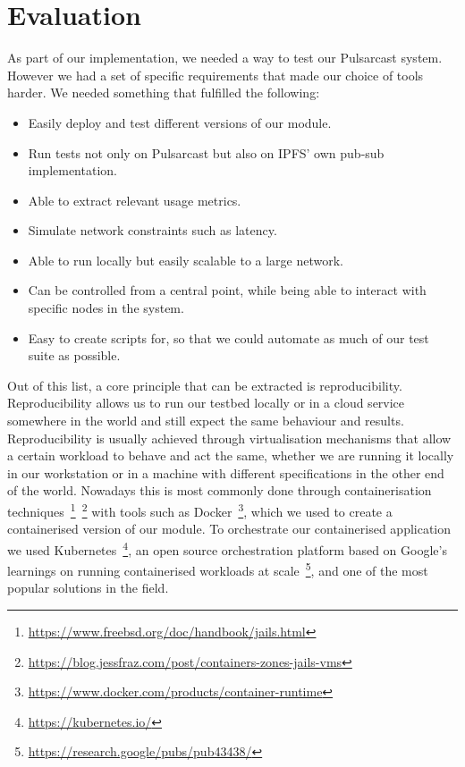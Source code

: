 
\section{Evaluation}
\label{section:evaluation}

As part of our implementation, we needed a way to test our Pulsarcast system.
However we had a set of specific requirements that made our choice of tools
harder. We needed something that fulfilled the following:

\begin{itemize}
  \item Easily deploy and test different versions of our module.
  \item Run tests not only on Pulsarcast but also on IPFS' own pub-sub
    implementation.
  \item Able to extract relevant usage metrics.
  \item Simulate network constraints such as latency.
  \item Able to run locally but easily scalable to a large network.
  \item Can be controlled from a central point, while being able to interact
    with specific nodes in the system.
  \item Easy to create scripts for, so that we could automate as much of our
    test suite as possible.
\end{itemize}

Out of this list, a core principle that can be extracted is
reproducibility. Reproducibility allows us to run our testbed locally or in a
cloud service somewhere in the world and still expect the same behaviour and
results. Reproducibility is usually achieved through virtualisation mechanisms
that allow a certain workload to behave and act the same, whether we are
running it locally in our workstation or in a machine with different
specifications in the other end of the world. Nowadays this is most commonly
done through containerisation
techniques~\footnote{\url{https://www.freebsd.org/doc/handbook/jails.html}}~\footnote{\url{https://blog.jessfraz.com/post/containers-zones-jails-vms}}
with tools such as
Docker~\footnote{\url{https://www.docker.com/products/container-runtime}}, which we
used to create a containerised version of our module. To orchestrate our
containerised application we used Kubernetes~\footnote{\url{https://kubernetes.io/}},
an open source orchestration platform based on Google's learnings on running
containerised workloads at
scale~\footnote{\url{https://research.google/pubs/pub43438/}}, and one of the most
popular solutions in the field.

